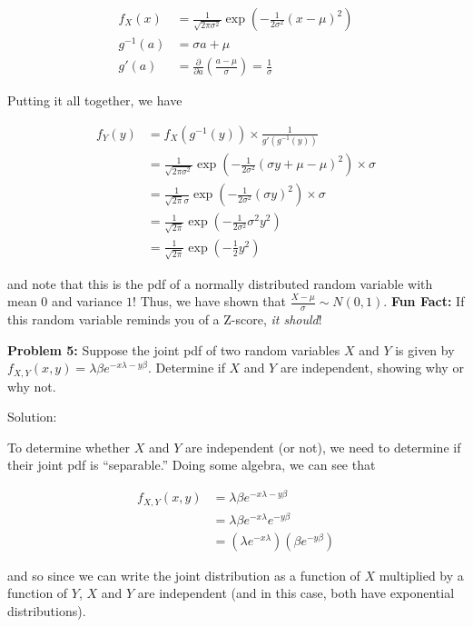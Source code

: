 \documentclass[
  letterpaper,
  DIV=11,
  numbers=noendperiod]{scrreprt}
\begin{document}
\begin{align*}
    f_X(x) & = \frac{1}{\sqrt{2 \pi \sigma^2}} \exp(-\frac{1}{2\sigma^2} (x - \mu)^2) \\
    g^{-1}(a) & = \sigma a + \mu \\
    g'(a) & = \frac{\partial}{\partial a} \left(\frac{a - \mu}{\sigma}\right) = \frac{1}{\sigma}
\end{align*}

Putting it all together, we have

\begin{align*}
    f_Y(y) & = f_X(g^{-1}(y)) \times \frac{1}{g'(g^{-1}(y))} \\
    & = \frac{1}{\sqrt{2 \pi \sigma^2}} \exp(-\frac{1}{2\sigma^2} (\sigma y + \mu - \mu)^2) \times \sigma \\
    & = \frac{1}{\sqrt{2 \pi} \sigma} \exp(-\frac{1}{2\sigma^2} (\sigma y)^2) \times \sigma \\
    & = \frac{1}{\sqrt{2 \pi}} \exp(-\frac{1}{2\sigma^2} \sigma^2 y^2) \\
    & = \frac{1}{\sqrt{2 \pi}} \exp(-\frac{1}{2} y^2)
\end{align*}

and note that this is the pdf of a normally distributed random variable
with mean \(0\) and variance \(1\)! Thus, we have shown that
\(\frac{X - \mu}{\sigma} \sim N(0,1)\). \textbf{Fun Fact:} If this
random variable reminds you of a Z-score, \emph{it should}!

\textbf{Problem 5:} Suppose the joint pdf of two random variables \(X\)
and \(Y\) is given by
\(f_{X,Y}(x,y) = \lambda \beta e^{-x\lambda - y\beta}\). Determine if
\(X\) and \(Y\) are independent, showing why or why not.

Solution:

To determine whether \(X\) and \(Y\) are independent (or not), we need
to determine if their joint pdf is ``separable.'' Doing some algebra, we
can see that

\begin{align*}    
f_{X,Y}(x,y) & = \lambda \beta e^{-x \lambda - y\beta} \\    
& = \lambda \beta e^{-x \lambda} e^{-y \beta} \\   
& = \left( \lambda  e^{-x \lambda} \right) \left( \beta e^{-y \beta} \right) 
\end{align*}

and so since we can write the joint distribution as a function of \(X\)
multiplied by a function of \(Y\), \(X\) and \(Y\) are independent (and
in this case, both have exponential distributions).
\end{document}
